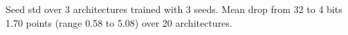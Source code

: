\begin{table}[t]
\centering
\caption{Accuracy Seed Noise (Points)}
\label{tab:accuracy}
\footnotesize
{}

\vspace{2pt}
{\footnotesize Seed std over 3 architectures trained with 3 seeds. Mean drop from 32 to 4 bits 1.70 points (range 0.58 to 5.08) over 20 architectures.}
\end{table}
